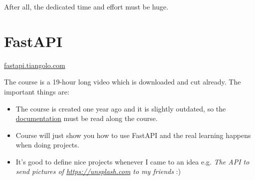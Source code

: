 		    After all, \textsf{the dedicated time and effort must be huge.}
		    	
		\section{FastAPI}
			\epigraph{\sffamily {}}{\href{https://fastapi.tiangolo.com}{fastapi.tiangolo.com}}
			
			
			\noindent The course is a 19-hour long video which is downloaded and cut already. The important things are:
			\begin{itemize}
				\item The course is created one year ago and it is slightly outdated, so the \href{https://fastapi.tiangolo.com}{documentation} must be read along the course.
				
				\item Course will just show you how to use FastAPI and the real learning happens when doing projects.
				
				\item It's good to define nice projects whenever I came to an idea
				e.g. \textit{The API to send pictures of \url{https://unsplash.com} to my friends} :)
			\end{itemize}

